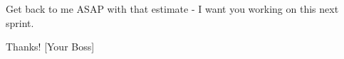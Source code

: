 \documentclass{report}
\newcommand*{\pts}[1]{\addtocounter{points}{#1}(#1pt)}
\begin{document}
\begin{spacing}{1.4}
\begin{enumerate}[leftmargin=*]
    Get back to me ASAP with that estimate - I want you working on this next sprint.

    Thanks!
    [Your Boss]
    
    














\end{enumerate}
\end{spacing}
\end{document}
